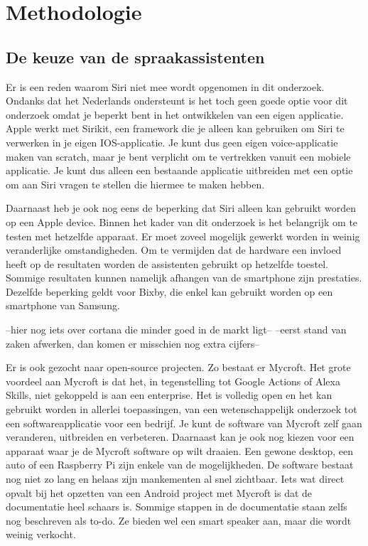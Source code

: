 
\chapter{Methodologie}
\label{ch:methodologie}

\section{De keuze van de spraakassistenten}
Er is een reden waarom Siri niet mee wordt opgenomen in dit onderzoek. Ondanks dat het Nederlands ondersteunt is het toch geen goede optie voor dit onderzoek omdat je beperkt bent in het ontwikkelen van een eigen applicatie. Apple werkt met Sirikit, een framework die je alleen kan gebruiken om Siri te verwerken in je eigen IOS-applicatie. Je kunt dus geen eigen voice-applicatie maken van scratch, maar je bent verplicht om te vertrekken vanuit een mobiele applicatie. Je kunt dus alleen een bestaande applicatie uitbreiden met een optie om aan Siri vragen te stellen die hiermee te maken hebben.

Daarnaast heb je ook nog eens de beperking dat Siri alleen kan gebruikt worden op een Apple device. Binnen het kader van dit onderzoek is het belangrijk om te testen met hetzelfde apparaat. Er moet zoveel mogelijk gewerkt worden in weinig veranderlijke omstandigheden. Om te vermijden dat de hardware een invloed heeft op de resultaten worden de assistenten gebruikt op hetzelfde toestel. Sommige resultaten kunnen namelijk afhangen van de smartphone zijn prestaties. Dezelfde beperking geldt voor Bixby, die enkel kan gebruikt worden op een smartphone van Samsung.

--hier nog iets over cortana die minder goed in de markt ligt--
--eerst stand van zaken afwerken, dan komen er misschien nog extra cijfers--

Er is ook gezocht naar open-source projecten. Zo bestaat er Mycroft. Het grote voordeel aan Mycroft is dat het, in tegenstelling tot Google Actions of Alexa Skills, niet gekoppeld is aan een enterprise. Het is volledig open en het kan gebruikt worden in allerlei toepassingen, van een wetenschappelijk onderzoek tot een softwareapplicatie voor een bedrijf. Je kunt de software van Mycroft zelf gaan veranderen, uitbreiden en verbeteren. Daarnaast kan je ook nog kiezen voor een apparaat waar je de Mycroft software op wilt draaien. Een gewone desktop, een auto of een Raspberry Pi zijn enkele van de mogelijkheden.
De software bestaat nog niet zo lang en helaas zijn mankementen al snel zichtbaar. Iets wat direct opvalt bij het opzetten van een Android project met Mycroft is dat de documentatie heel schaars is. Sommige stappen in de documentatie staan zelfs nog beschreven als to-do. Ze bieden wel een smart speaker aan, maar die wordt weinig verkocht.

